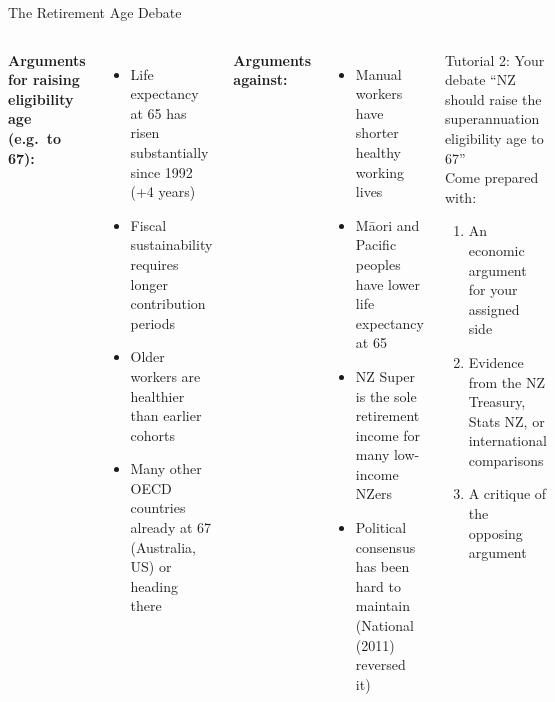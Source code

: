 \documentclass[aspectratio=169, 12pt]{beamer}
\begin{document}
\begin{frame}{The Retirement Age Debate}
  \begin{columns}
      \textbf{Arguments for raising eligibility age (e.g.\ to 67):}
      \begin{itemize}
        \item Life expectancy at 65 has risen substantially since 1992 (+4 years)
        \item Fiscal sustainability requires longer contribution periods
        \item Older workers are healthier than earlier cohorts
        \item Many other OECD countries already at 67 (Australia, US) or heading there
      \end{itemize}
      \vspace{0.4em}
      \textbf{Arguments against:}
      \begin{itemize}
        \item Manual workers have shorter healthy working lives
        \item Māori and Pacific peoples have lower life expectancy at 65
        \item NZ Super is the sole retirement income for many low-income NZers
        \item Political consensus has been hard to maintain (National (2011) reversed it)
      \end{itemize}
      \begin{alertblock}{Tutorial 2: Your debate}
        ``NZ should raise the superannuation eligibility age to 67''\\[0.3em]
        Come prepared with:
        \begin{enumerate}
          \item An economic argument for your assigned side
          \item Evidence from the NZ Treasury, Stats NZ, or international comparisons
          \item A critique of the opposing argument
        \end{enumerate}
      \end{alertblock}
  \end{columns}
\end{frame}
\end{document}
